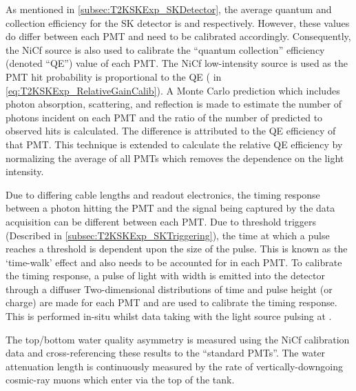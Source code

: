 As mentioned in \autoref{subsec:T2KSKExp_SKDetector}, the average quantum and collection efficiency for the SK detector is  and  respectively. However, these values do differ between each PMT and need to be calibrated accordingly. Consequently, the NiCf source is also used to calibrate the ``quantum \quickmath{\times} collection'' efficiency (denoted ``QE'') value of each PMT.
The NiCf low-intensity source is used as the PMT hit probability is proportional to the QE ( in \autoref{eq:T2KSKExp_RelativeGainCalib}). A Monte Carlo prediction which includes photon absorption, scattering, and reflection is made to estimate the number of photons incident on each PMT and the ratio of the number of predicted to observed hits is calculated. The difference is attributed to the QE efficiency of that PMT. This technique is extended to calculate the relative QE efficiency by normalizing the average of all PMTs which removes the dependence on the light intensity.

Due to differing cable lengths and readout electronics, the timing response between a photon hitting the PMT and the signal being captured by the data acquisition can be different between each PMT. Due to threshold triggers (Described in \autoref{subsec:T2KSKExp_SKTriggering}), the time at which a pulse reaches a threshold is dependent upon the size of the pulse. This is known as the `time-walk' effect and also needs to be accounted for in each PMT. To calibrate the timing response, a pulse of light with width  is emitted into the detector through a diffuser
Two-dimensional distributions of time and pulse height (or charge) are made for each PMT and are used to calibrate the timing response. This is performed in-situ whilst data taking with the light source pulsing at .

The top/bottom water quality asymmetry is measured using the NiCf calibration data and cross-referencing these results to the ``standard PMTs''. The water attenuation length is continuously measured by the rate of vertically-downgoing cosmic-ray muons which enter via the top of the tank.

